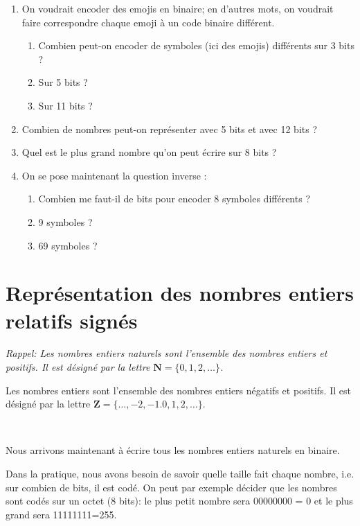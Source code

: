 \documentclass[11pt, a4paper]{book}
\begin{document}
\begin{exercice}
\begin{enumerate}
\item On voudrait encoder des emojis en binaire; en d'autres mots, on voudrait faire correspondre chaque emoji à un code binaire différent.
\begin{enumerate}
\item Combien peut-on encoder de symboles (ici des emojis) différents sur 3 bits ?
\item Sur 5 bits ?
\item Sur 11 bits ?
\end{enumerate}

\item Combien de nombres peut-on représenter avec 5 bits et avec 12 bits ?

\item Quel est le plus grand nombre qu'on peut écrire sur 8 bits ?


\vspace{10pt}
\item On se pose maintenant la question inverse : 
\begin{enumerate}
\item Combien me faut-il de bits pour encoder 8 symboles différents ?
\item 9 symboles ?
\item 69 symboles ?
\end{enumerate}

\end{enumerate}
\end{exercice}


\section{Représentation des nombres entiers relatifs signés}

{\it Rappel: Les nombres entiers naturels sont l'ensemble des nombres entiers et positifs. Il est désigné par la lettre $\mathbf{N}=\{0,1,2,\ldots\}$.

Les nombres entiers  sont l'ensemble des nombres entiers négatifs et positifs. Il est désigné par la lettre $\mathbf{Z}=\{\ldots,-2,-1.0,1,2,\ldots\}$.}

\ 

Nous arrivons maintenant à écrire tous les nombres entiers naturels en binaire. 

\begin{remarque}

Dans la pratique, nous avons besoin de savoir quelle taille fait chaque nombre, i.e. sur combien de bits, il est codé. On peut par exemple décider que les nombres sont codés sur un octet (8 bits): le plus petit nombre sera 00000000 = 0 et le plus grand sera 11111111=255.
\end{remarque}
\end{document}
